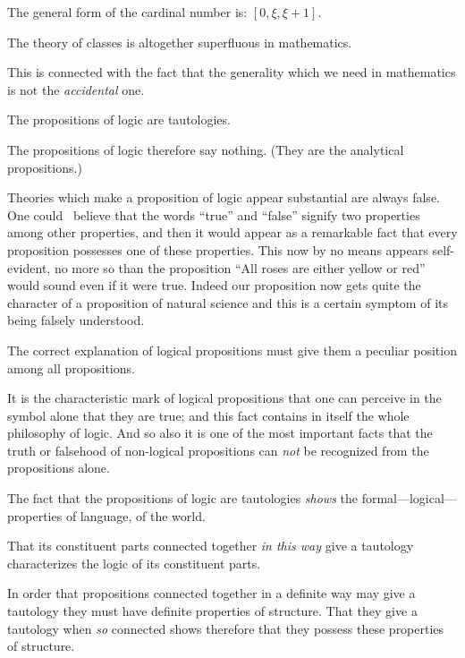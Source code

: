 {The general form of the cardinal number is:
$[0, \xi, \xi + 1]$.}


{The theory of classes is altogether superfluous
in mathematics.

This is connected with the fact that the generality
which we need in mathematics is not the
\emph{accidental} one.}


{The propositions of logic are tautologies.}


{The propositions of logic therefore say nothing.
(They are the analytical propositions.)}


{Theories which make a proposition of logic
appear substantial are always false. One could
\exempliGratia\ believe that the words ``true'' and ``false''
signify two properties among other properties,
and then it would appear as a remarkable fact
that every proposition possesses one of these
properties. This now by no means appears self-evident,
no more so than the proposition ``All
roses are either yellow or red'' would sound even
if it were true. Indeed our proposition now gets
quite the character of a proposition of natural
science and this is a certain symptom of its being
falsely understood.}


{The correct explanation of logical propositions
must give them a peculiar position among all
propositions.}


{It is the characteristic mark of logical propositions
that one can perceive in the symbol alone
that they are true; and this fact contains in itself
the whole philosophy of logic. And so also it is
one of the most important facts that the truth or
falsehood of non-logical propositions can \emph{not} be
recognized from the propositions alone.}


{The fact that the propositions of logic are
tautologies \emph{shows} the for\-mal---log\-i\-cal---prop\-er\-ties
of language, of the world.

That its constituent parts connected together \emph{in
this way} give a tautology characterizes the logic of
its constituent parts.

In order that propositions connected together
in a definite way may give a tautology they
must have definite properties of structure. That
they give a tautology when \emph{so} connected shows
therefore that they possess these properties of
structure.}



